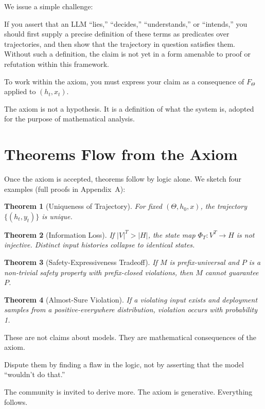 \documentclass[11pt,a4paper]{article}
\newtheorem{theorem}{Theorem}[section]
\begin{document}
We issue a simple challenge:

If you assert that an LLM ``lies,'' ``decides,'' ``understands,'' or ``intends,'' you should first supply a precise definition of these terms as predicates over trajectories, and then show that the trajectory in question satisfies them. Without such a definition, the claim is not yet in a form amenable to proof or refutation within this framework.

To work within the axiom, you must express your claim as a consequence of $F_\Theta$ applied to $(h_t, x_t)$.

The axiom is not a hypothesis. It is a definition of what the system is, adopted for the purpose of mathematical analysis.

\section{Theorems Flow from the Axiom}

Once the axiom is accepted, theorems follow by logic alone. We sketch four examples (full proofs in Appendix~A):

\begin{theorem}[Uniqueness of Trajectory]
For fixed $(\Theta, h_0, x)$, the trajectory $\{(h_t, y_t)\}$ is unique.
\end{theorem}

\begin{theorem}[Information Loss]
If $|V|^T > |H|$, the state map $\Phi_T: V^T \to H$ is not injective. Distinct input histories collapse to identical states.
\end{theorem}

\begin{theorem}[Safety-Expressiveness Tradeoff]
If $M$ is prefix-universal and $P$ is a non-trivial safety property with prefix-closed violations, then $M$ cannot guarantee $P$.
\end{theorem}

\begin{theorem}[Almost-Sure Violation]
If a violating input exists and deployment samples from a positive-everywhere distribution, violation occurs with probability 1.
\end{theorem}

These are not claims about models. They are mathematical consequences of the axiom.

Dispute them by finding a flaw in the logic, not by asserting that the model ``wouldn't do that.''

The community is invited to derive more. The axiom is generative. Everything follows.
\end{document}
